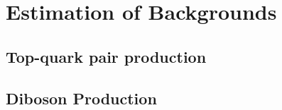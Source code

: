 \section{Estimation of Backgrounds}
\label{sec:stop_background_estimate}


\subsection{Top-quark pair production}
\label{sec:stop_ttbar_estimate}

\subsection{Diboson Production}
\label{sec:stop_vv_estimate}
